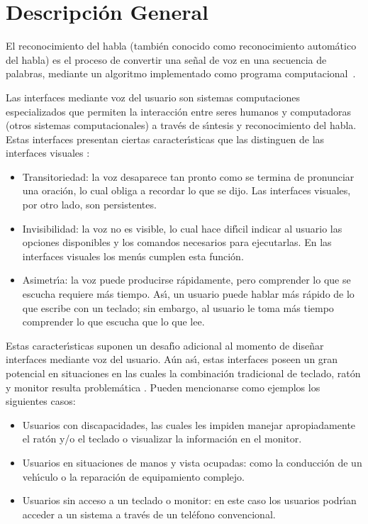 \section{Descripci\'on General}
\label{sec:problema-general}

El reconocimiento del habla (tambi\'en conocido como reconocimiento autom\'atico del habla) es el proceso
de convertir una se\~nal de voz en una secuencia de palabras, mediante un algoritmo implementado
como programa \mbox{computacional \cite{JaisalAReview2012}}.

Las interfaces mediante voz del usuario son sistemas computaciones especializados que permiten la
interacci\'on entre seres humanos y computadoras (otros sistemas computacionales) a trav\'es de
s{\'\i}ntesis y reconocimiento del habla. Estas interfaces presentan ciertas caracter{\'\i}sticas que las
distinguen de las interfaces visuales \cite{GabrielVoice2007}:

\begin{itemize}
	\item Transitoriedad: la voz desaparece tan pronto como se termina de pronunciar una oraci\'on,
	lo cual obliga a recordar lo que se dijo. Las interfaces visuales, por otro lado, son persistentes.
	\item Invisibilidad: la voz no es visible, lo cual hace dif{\'\i}cil indicar al usuario las opciones
	disponibles y los comandos necesarios para ejecutarlas. En las interfaces visuales los men\'us
	cumplen esta funci\'on.
	\item Asimetr{\'\i}a: la voz puede producirse r\'apidamente, pero comprender lo que se escucha requiere
	m\'as tiempo. As{\'\i}, un usuario puede hablar m\'as r\'apido de lo que escribe con un teclado; sin embargo,
	al usuario le toma m\'as tiempo comprender lo que escucha que lo que lee.
\end{itemize}

Estas caracter{\'\i}sticas suponen un desaf{\'\i}o adicional al momento de dise\~nar interfaces mediante voz del
usuario. A\'un as{\'\i}, estas interfaces poseen un gran potencial en situaciones en las cuales la
combinaci\'on tradicional de teclado, rat\'on y monitor resulta problem\'atica \cite{NielsenVoice2003}.
Pueden mencionarse como ejemplos los siguientes casos:

\begin{itemize}
	\item Usuarios con discapacidades, las cuales les impiden manejar apropiadamente el rat\'on y/o
	el teclado o visualizar la informaci\'on en el monitor.
	\item Usuarios en situaciones de manos y vista ocupadas: como la conducci\'on de un veh{\'\i}culo o
	la reparaci\'on de equipamiento complejo.
	\item Usuarios sin acceso a un teclado o monitor: en este caso los usuarios podr{\'\i}an acceder
	a un sistema a trav\'es de un tel\'efono convencional.
\end{itemize}


